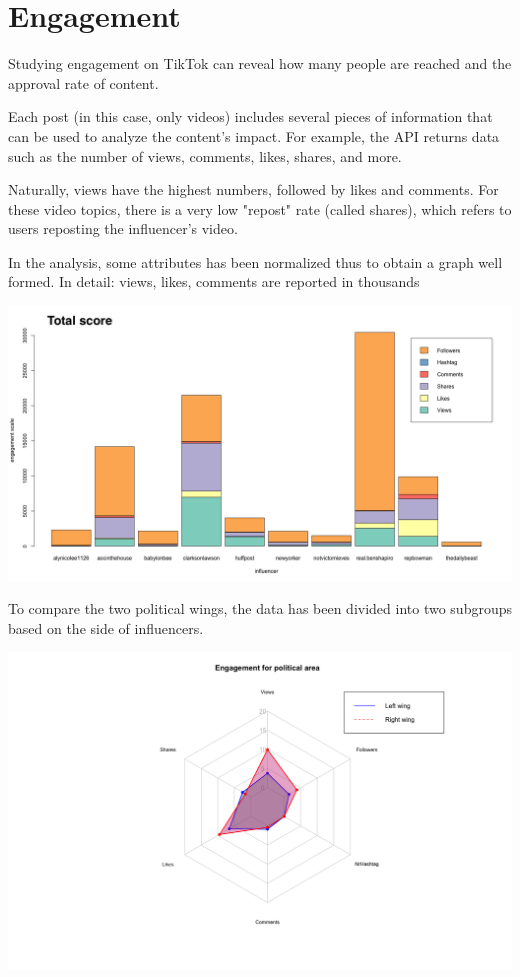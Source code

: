 \section{Engagement}

Studying engagement on TikTok can reveal how many people are reached and the approval rate of content.

Each post (in this case, only videos) includes several pieces of information that can be used to analyze the content's impact. For example, the API returns data such as the number of views, comments, likes, shares, and more.

Naturally, views have the highest numbers, followed by likes and comments. For these video topics, there is a very low "repost" rate (called shares), which refers to users reposting the influencer's video.

In the analysis, some attributes has been normalized thus to obtain a graph well formed.
In detail: views, likes, comments are reported in thousands

\includegraphics[width = .48\textwidth]{images/Final_Engagement_TotalScore.png}

To compare the two political wings, the data has been divided into two subgroups based on the side of influencers.

\includegraphics[width = .48\textwidth]{images/Final_Engagement_EngegementPerArea.png}